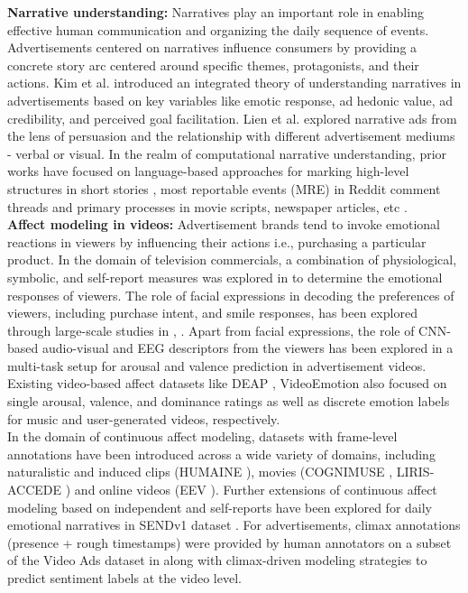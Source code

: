 \textbf{Narrative understanding:} 
Narratives \cite{Fisher1987HumanCA} play an important role in enabling effective human communication and organizing the daily sequence of events. Advertisements centered on narratives \cite{Escalas1998ADVERTISINGNW} influence consumers by providing a concrete story arc centered around specific themes, protagonists, and their actions. Kim et al. \cite{Kim2017WhyNA} introduced an integrated theory of understanding narratives in advertisements based on key variables like emotic response, ad hedonic value, ad credibility, and perceived goal facilitation. Lien et al. \cite{Lien2013NarrativeAT} explored narrative ads from the lens of persuasion and the relationship with different advertisement mediums - verbal or visual. In the realm of computational narrative understanding, prior works have focused on language-based approaches for marking high-level structures in short stories \cite{Li2017AnnotatingHS}, most reportable events (MRE) in Reddit comment threads \cite{Ouyang2015ModelingRE} and primary processes in movie scripts, newspaper articles, etc \cite{Boyd2020TheNA}.\\
\textbf{Affect modeling in videos:}
Advertisement brands tend to invoke emotional reactions \cite{Holbrook1984TheRO} in viewers by influencing their actions i.e., purchasing a particular product. In the domain of television commercials, a combination of physiological, symbolic, and self-report measures was explored in \cite{Micu2010MeasurableEH} to determine the emotional responses of viewers. The role of facial expressions in decoding the preferences of viewers, including purchase intent, and smile responses, has been explored through large-scale studies in \cite{McDuff2014PredictingAL}, \cite{Teixeira2014WhyWA}. Apart from facial expressions, the role of CNN-based audio-visual and EEG descriptors from the viewers has been explored in a multi-task setup \cite{Shukla2017AffectRI,Shukla2017EvaluatingCV,Shukla2019RecognitionOA} for arousal and valence prediction in advertisement videos. Existing video-based affect datasets like DEAP \cite{Koelstra2012DEAPAD}, VideoEmotion \cite{Jiang2014PredictingEI} also focused on single arousal, valence, and dominance ratings as well as discrete emotion labels for music and user-generated videos, respectively.\\
In the domain of continuous affect modeling, datasets with frame-level annotations have been introduced across a wide variety of domains, including naturalistic and induced clips (HUMAINE \cite{DouglasCowie2007TheHD}), movies (COGNIMUSE \cite{Zlatintsi2017COGNIMUSEAM}, LIRIS-ACCEDE \cite{Baveye2015LIRISACCEDEAV}) and online videos (EEV \cite{Sun2020EEVDP}). Further extensions of continuous affect modeling based on independent and self-reports have been explored for daily emotional narratives in SENDv1 dataset \cite{Ong2019ModelingEI}. For advertisements, climax annotations (presence + rough timestamps) were provided by human annotators on a subset of the Video Ads dataset \cite{Hussain2017AutomaticUO} in \cite{Ye2018StoryUI} along with climax-driven modeling strategies to predict sentiment labels at the video level. 
